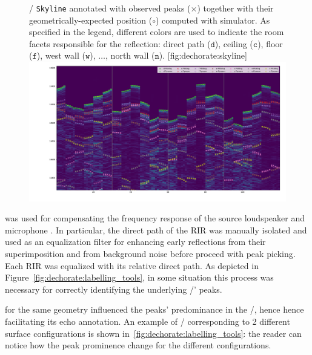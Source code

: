 \begin{figure}
    \begin{sidecaption}[]{
        \RIR/ \texttt{Skyline} annotated with observed peaks ($\times$) together with their geometrically-expected position ($\circ{}$) computed with  simulator.
        As specified in the legend, different colors are used to indicate the room facets responsible for the reflection: direct path ($\mathtt{d}$), ceiling ($\mathtt{c}$), floor ($\mathtt{f}$), west wall ($\mathtt{w}$), $\dots$, north wall ($\mathtt{n}$).
    }[fig:dechorate:skyline]
    \centering
    \includegraphics[trim={15em 15em 2em 0},clip,width=\linewidth]{figures/dechorate/rir_skyline_final_mod4paper.pdf}
    \end{sidecaption}
\end{figure}

 was used for compensating the frequency response of the source loudspeaker and microphone . In particular, the direct path of the RIR was manually isolated and used as an equalization filter for enhancing early reflections from their superimposition and from background noise before proceed with peak picking. Each RIR was equalized with its relative direct path. As depicted in Figure~\ref{fig:dechorate:labelling_tools}, in some situation this process was necessary for correctly identifying the underlying \TOAs/' peaks.

 for the same geometry influenced the peaks' predominance in the \RIR/, hence hence facilitating its echo annotation.
An example of \RIRs/ corresponding to 2 different surface configurations is shown in~\cref{fig:dechorate:labelling_tools}: the reader can notice how the peak prominence change for the different configurations.


